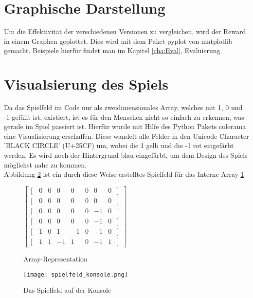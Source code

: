 \section{Graphische Darstellung}
Um die Effektivität der verschiedenen Versionen zu vergleichen, wird der Reward in einem Graphen geplottet. Dies wird mit dem Paket pyplot von matplotlib \cite{pyplot} gemacht. Beispiele hierfür findet man im Kapitel \ref{cha:Eval}, Evaluierung. \\


\section{Visualsierung des Spiels}
\label{visualisierung}
Da das Spielfeld im Code nur als zweidimensionales Array, welches mit 1, 0 und -1 gefüllt ist, existiert, ist es für den Menschen nicht so einfach zu erkennen, was gerade im Spiel passiert ist. Hierfür wurde mit Hilfe des Python Pakets colorama \cite{colorama} eine Visualisierung erschaffen. Diese wandelt alle Felder in den Unicode Character 'BLACK CIRCLE' (U+25CF) um, wobei die 1 gelb und die -1 rot eingefärbt werden. Es wird noch der Hintergrund blau eingefärbt, um dem Design des Spiels möglichst nahe zu kommen. \\
Abbildung \ref{fig:spielfeld_konsole} ist ein durch diese Weise erstelltes Spielfeld für das Interne Array \ref{fig:array}\\
\begin{figure}[ht]
\centering
$\begin{bmatrix}                                
[ \, & 0  & 0 & 0 & 0 & 0 & 0 & 0& ]\, \\                                               
[ \, & 0  & 0 & 0 & 0 & 0 & 0 & 0& ]\, \\  
[ \, & 0  & 0 & 0 & 0 & 0 & -1 & 0& ]\, \\  
[ \, & 0  & 0 & 0 & 0 & 0 & -1 & 0& ]\, \\  
[ \, & 1  & 0 & 1 & -1 & 0 & -1 & 0& ]\, \\  
[ \, & 1  & 1 & -1 & 1 & 0 & -1 & 1& ]\,                                               
\end{bmatrix}$
\caption{Array-Representation}
 \label{fig:array}
\end{figure}


\begin{figure}[h!]
  \texttt{[image: spielfeld\_konsole.png]}
  \centering
  \caption{Das Spielfeld auf der Konsole}
  \label{fig:spielfeld_konsole}
\end{figure}
